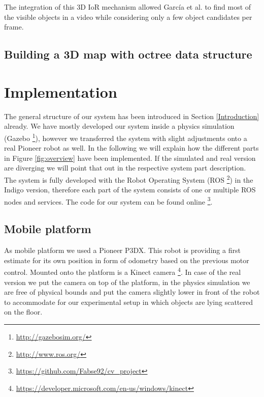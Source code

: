 \documentclass[a4paper,11pt,english]{article}
\begin{document}
The integration of this 3D IoR mechanism allowed García et al. to find most of the visible objects in a video while considering only a few object candidates per frame.

\subsection{Building a 3D map with octree data structure}
\label{Theoretical_background:Building_a_3Dmap_with_octree_data_structure}



\section{Implementation}
\label{Implementation}

The general structure of our system has been introduced in Section \ref{Introduction} already.
We have mostly developed our system inside a physics simulation (Gazebo \footnote{\url{http://gazebosim.org/}}), however we transferred the system with slight adjustments onto a real Pioneer robot as well.
In the following we will explain how the different parts in Figure \ref{fig:overview} have been implemented. If the simulated and real version are diverging we will point that out in the respective system part description.
The system is fully developed with the Robot Operating System (ROS \footnote{\url{http://www.ros.org/}}) in the Indigo version, therefore each part of the system consists of one or multiple ROS nodes and services.
The code for our system can be found online \footnote{\url{https://github.com/Fabse92/cv_project}}.

\subsection{Mobile platform}
As mobile platform we used a Pioneer P3DX. This robot is providing a first estimate for its own position in form of odometry based on the previous motor control. Mounted onto the platform is a Kinect camera \footnote{\url{https://developer.microsoft.com/en-us/windows/kinect}}. In case of the real version we put the camera on top of the platform, in the physics simulation we are free of physical bounds and put the camera slightly lower in front of the robot to accommodate for our experimental setup in which objects are lying scattered on the floor.
\end{document}
